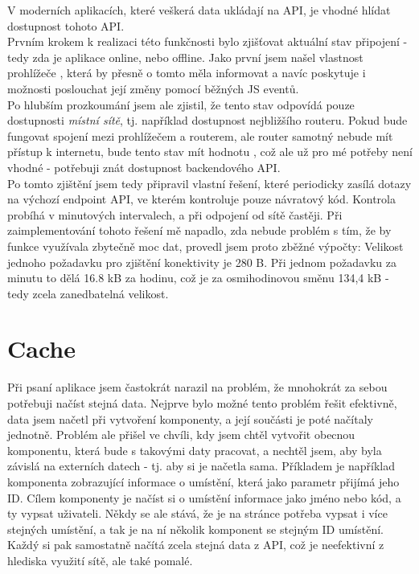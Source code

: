 V moderních aplikacích, které veškerá data ukládají na API, je vhodné hlídat dostupnost tohoto API.\\
Prvním krokem k realizaci této funkčnosti bylo zjišťovat aktuální stav připojení - tedy zda je aplikace online, nebo offline. Jako první jsem našel vlastnost prohlížeče  \cite{online}, která by přesně o tomto měla informovat a navíc poskytuje i možnosti poslouchat její změny pomocí běžných JS eventů.\\
Po hlubším prozkoumání jsem ale zjistil, že tento stav odpovídá pouze dostupnosti \emph{místní sítě}, tj. například dostupnost nejbližšího routeru. Pokud bude fungovat spojení mezi prohlížečem a routerem, ale router samotný nebude mít přístup k internetu, bude tento stav mít hodnotu , což ale už pro mé potřeby není vhodné - potřebuji znát dostupnost backendového API.\\
Po tomto zjištění jsem tedy připravil vlastní řešení, které periodicky zasílá dotazy na výchozí endpoint API, ve kterém kontroluje pouze návratový kód. Kontrola probíhá v minutových intervalech, a při odpojení od sítě častěji. Při zaimplementování tohoto řešení mě napadlo, zda nebude problém s tím, že by funkce využívala zbytečně moc dat, provedl jsem proto zběžné výpočty: Velikost jednoho požadavku pro zjištění konektivity je 280 B. Při jednom požadavku za minutu to dělá 16.8 kB za hodinu, což je za osmihodinovou směnu 134,4 kB - tedy zcela zanedbatelná velikost.


\section{Cache} \label{impl:cache}

Při psaní aplikace jsem častokrát narazil na problém, že mnohokrát za sebou potřebuji načíst stejná data. Nejprve bylo možné tento problém řešit efektivně, data jsem načetl při vytvoření komponenty, a její součásti je poté načítaly jednotně. Problém ale přišel ve chvíli, kdy jsem chtěl vytvořit obecnou komponentu, která bude s takovými daty pracovat, a nechtěl jsem, aby byla závislá na externích datech - tj. aby si je načetla sama. Příkladem je například komponenta zobrazující informace o umístění, která jako parametr přijímá jeho ID. Cílem komponenty je načíst si o umístění informace jako jméno nebo kód, a ty vypsat uživateli. Někdy se ale stává, že je na stránce potřeba vypsat i více stejných umístění, a tak je na ní několik komponent se stejným ID umístění. Každý si pak samostatně načítá zcela stejná data z API, což je neefektivní z hlediska využití sítě, ale také pomalé.\\

